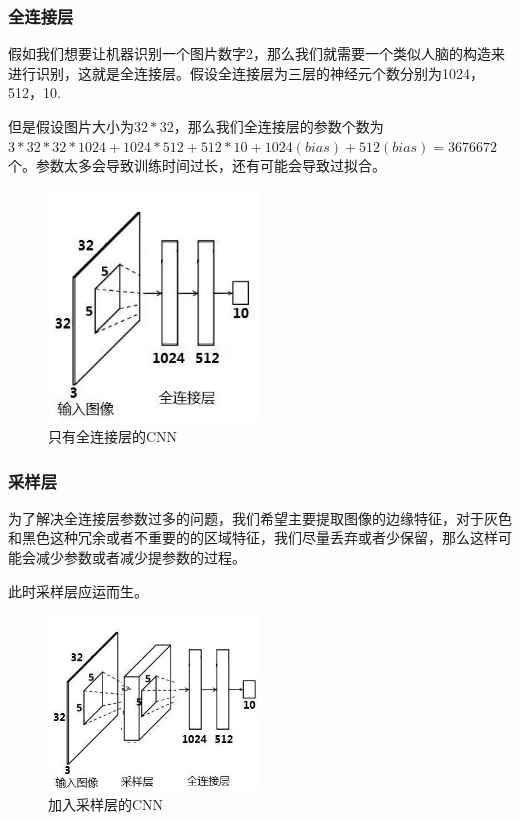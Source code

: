\documentclass[UTF8]{ctexart}
\begin{document}
\subsubsection{全连接层}
假如我们想要让机器识别一个图片数字2，那么我们就需要一个类似人脑的构造来进行识别，这就是全连接层。假设全连接层为三层的神经元个数分别为1024，512，10.
\par 但是假设图片大小为$32*32$，那么我们全连接层的参数个数为$3*32*32*1024+1024*512+512*10+1024(bias)+512(bias)=3676672$个。参数太多会导致训练时间过长，还有可能会导致过拟合。
\begin{figure}[htb]
	\centering
	\includegraphics[width=0.50\textwidth]{figures/cnn1.jpg}
	\caption{只有全连接层的CNN}
	\label{cnn1}
\end{figure}
\subsubsection{采样层}
为了解决全连接层参数过多的问题，我们希望主要提取图像的边缘特征，对于灰色和黑色这种冗余或者不重要的的区域特征，我们尽量丢弃或者少保留，那么这样可能会减少参数或者减少提参数的过程。
\par 此时采样层应运而生。
\begin{figure}[htb]
	\centering
	\includegraphics[width=0.50\textwidth]{figures/cnn2.jpg}
	\caption{加入采样层的CNN}
	\label{cnn2}
\end{figure}
\end{document}
